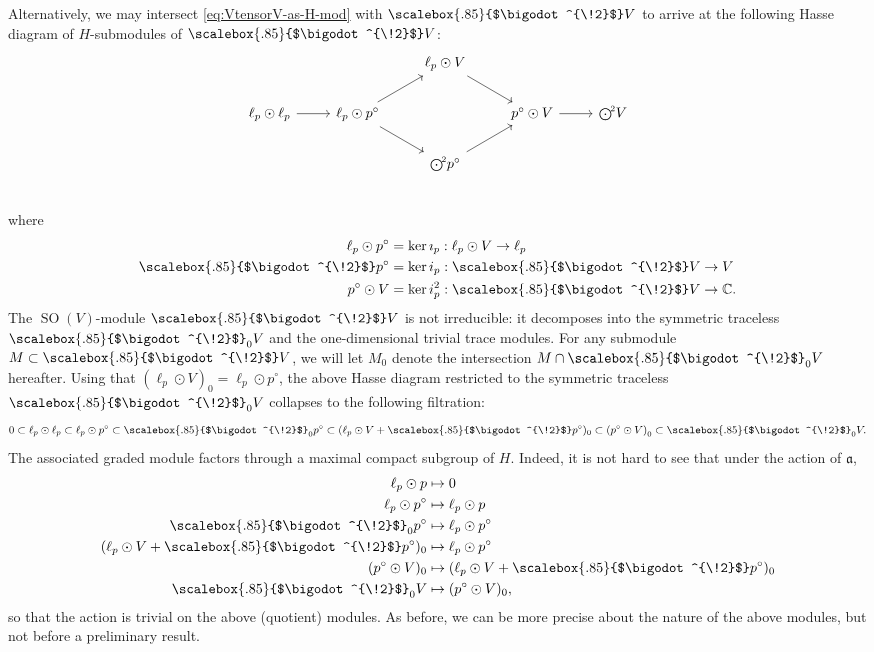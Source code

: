 \documentclass[11pt,reqno,a4paper,final]{amsart}
\newcommand\sym[1]{\scalebox{.85}{$\bigodot^{\!#1}$}}
\theoremstyle{plain}
\theoremstyle{definition}
\newcommand{\fa}{\mathfrak{a}}
\newcommand{\CC}{\mathbb{C}}
\newcommand{\1}{\mathbb{1}}
\newcommand{\SO}{\operatorname{SO}}
\numberwithin{equation}{section}
\begin{document}
Alternatively, we may intersect \eqref{eq:VtensorV-as-H-mod} with
$\sym{2} V$ to arrive at the following Hasse diagram of $H$-submodules
of $\sym{2} V$:
\begin{equation}
  \label{eq:VsymV-as-H-mod}
  \begin{tikzcd}
    & & \ell_p \odot V \arrow[rd] & &\\
    \ell_p \odot \ell_p \arrow[r]  & \ell_p \odot p^\circ \arrow[ru] \arrow[rd] & &  p^\circ \odot V \arrow[r] & \sym{2} V\\
    & & \sym{2} p^\circ \arrow[ru] & &\\
  \end{tikzcd}
\end{equation}
where
\begin{equation}
  \begin{split}
    \ell_p \odot p^\circ &= \ker \imath_p : \ell_p \odot V \to \ell_p\\
    \sym{2} p^\circ &= \ker i_p : \sym{2} V \to V\\
    p^\circ \odot V &= \ker i_p^2 : \sym{2} V \to \CC.
  \end{split}
\end{equation}
The $\SO(V)$-module $\sym{2} V$ is not irreducible: it decomposes into
the symmetric traceless $\sym{2}_0V$ and the one-dimensional trivial
trace modules.  For any submodule $M \subset \sym{2} V$, we will let 
$M_0$ denote the intersection $M \cap \sym{2}_0 V$ hereafter.  Using
that $(\ell_p\odot V)_0 = \ell_p \odot p^\circ$, the above Hasse
diagram restricted to the symmetric traceless $\sym{2}_0 V$ collapses
to the following filtration:
\begin{equation}
  \label{eq:VsymVtraceless-as-H-mod}
  0 \subset  \ell_p \odot \ell_p \subset \ell_p \odot p^\circ  \subset \sym{2}_0  p^\circ \subset (\ell_p \odot V + \sym{2}p^\circ)_0 \subset \left( p^\circ \odot V\right)_0 \subset \sym{2}_0 V.
\end{equation}
The associated graded module factors through a maximal compact
subgroup of $H$.  Indeed, it is not hard to see that under the
action of $\fa$,
\begin{equation}
  \label{eq:action-of-ideal-on-sym2}
  \begin{split}
    \ell_p \odot p & \mapsto 0\\
    \ell_p \odot p^\circ & \mapsto \ell_p \odot p\\
    \sym{2}_0 p^\circ& \mapsto \ell_p \odot p^\circ\\
    (\ell_p \odot V + \sym{2}p^\circ)_0 & \mapsto \ell_p \odot p^\circ \\
    (p^\circ \odot V)_0 & \mapsto  (\ell_p \odot V + \sym{2}p^\circ)_0\\
  \sym{2}_0 V & \mapsto (p^\circ \odot V)_0,
  \end{split}
\end{equation}
so that the action is trivial on the above (quotient) modules.  As
before, we can be more precise about the nature of the above modules,
but not before a preliminary result.
\end{document}
